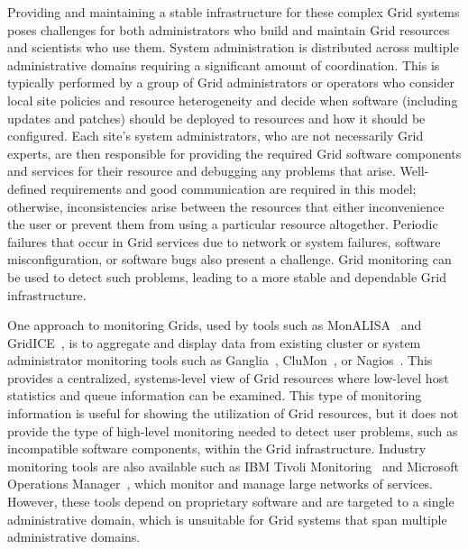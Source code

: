 \documentclass[times,10pt,twocolumn]{article}
\begin{document}
Providing and maintaining a stable infrastructure for these complex 
Grid systems poses challenges for both administrators who build and
maintain Grid resources and scientists who use them.  System
administration is distributed across multiple administrative domains 
requiring a significant amount of coordination.  This is typically performed by
a group of Grid administrators or operators who consider local site policies and
resource heterogeneity
and decide when software (including updates and patches) should be deployed to
resources and how it should be configured.  
Each site's system administrators, who are not necessarily Grid
experts, are then responsible for providing the required Grid software
components and services for their resource and debugging any problems that
arise.  Well-defined requirements and good communication are required in this
model; otherwise, inconsistencies arise between the resources that either
inconvenience the user or prevent them from using a particular resource
altogether.  Periodic failures that occur in Grid services due to network or
system failures, software misconfiguration, or software bugs also present a
challenge.  Grid monitoring can be used to detect such problems, leading to a
more stable and dependable Grid infrastructure.

One approach to monitoring Grids, used by tools such as
MonALISA~\cite{monalisa} and GridICE~\cite{gridice}, is to aggregate and
display data from existing cluster or system administrator monitoring tools
such as Ganglia~\cite{ganglia}, CluMon~\cite{clumon}, or
Nagios~\cite{nagios}.  This provides a centralized, systems-level view of Grid
resources where low-level host statistics and queue information can be
examined.  This type of monitoring information is useful for showing the
utilization of Grid resources, but it does not provide the type of
high-level monitoring needed to detect user problems, such as incompatible
software components, within the Grid infrastructure.  Industry monitoring
tools are also available such as IBM Tivoli Monitoring~\cite{tivoli} and
Microsoft Operations Manager~\cite{mom}, which monitor and manage large
networks of services.  However, these tools depend on proprietary software and
are targeted to a single administrative domain, which is unsuitable for Grid
systems that span multiple administrative domains.
\end{document}

